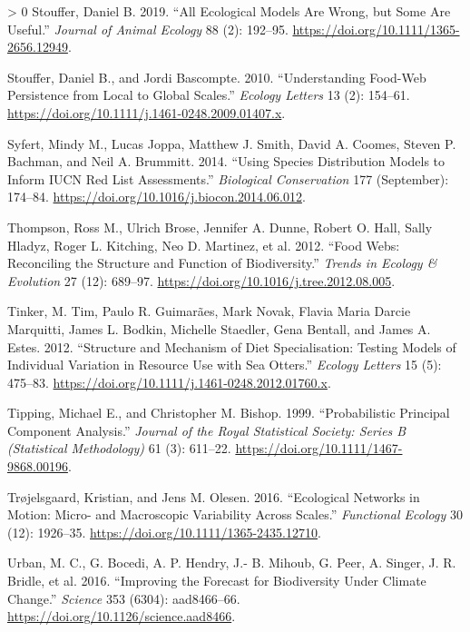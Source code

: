 \documentclass[11pt]{article}
\newlength{\cslhangindent}
\newenvironment{CSLReferences}[3] %
 {%
  \setlength{\parindent}{0pt}
  \ifodd #1 \everypar{\setlength{\hangindent}{\cslhangindent}}\ignorespaces\fi
  \ifnum #2 > 0
  \setlength{\parskip}{#2\baselineskip}
  \fi
 }%
 {}
\begin{document}
\begin{CSLReferences}{1}{0}
\leavevmode\hypertarget{ref-Stouffer2019AllEco}{}%
Stouffer, Daniel B. 2019. {``All Ecological Models Are Wrong, but Some
Are Useful.''} \emph{Journal of Animal Ecology} 88 (2): 192--95.
\url{https://doi.org/10.1111/1365-2656.12949}.

\leavevmode\hypertarget{ref-Stouffer2010UndFoo}{}%
Stouffer, Daniel B., and Jordi Bascompte. 2010. {``Understanding
Food-Web Persistence from Local to Global Scales.''} \emph{Ecology
Letters} 13 (2): 154--61.
\url{https://doi.org/10.1111/j.1461-0248.2009.01407.x}.

\leavevmode\hypertarget{ref-Syfert2014UsiSpe}{}%
Syfert, Mindy M., Lucas Joppa, Matthew J. Smith, David A. Coomes, Steven
P. Bachman, and Neil A. Brummitt. 2014. {``Using Species Distribution
Models to Inform IUCN Red List Assessments.''} \emph{Biological
Conservation} 177 (September): 174--84.
\url{https://doi.org/10.1016/j.biocon.2014.06.012}.

\leavevmode\hypertarget{ref-Thompson2012FooWeb}{}%
Thompson, Ross M., Ulrich Brose, Jennifer A. Dunne, Robert O. Hall,
Sally Hladyz, Roger L. Kitching, Neo D. Martinez, et al. 2012. {``Food
Webs: Reconciling the Structure and Function of Biodiversity.''}
\emph{Trends in Ecology \& Evolution} 27 (12): 689--97.
\url{https://doi.org/10.1016/j.tree.2012.08.005}.

\leavevmode\hypertarget{ref-Tinker2012StrMec}{}%
Tinker, M. Tim, Paulo R. Guimarães, Mark Novak, Flavia Maria Darcie
Marquitti, James L. Bodkin, Michelle Staedler, Gena Bentall, and James
A. Estes. 2012. {``Structure and Mechanism of Diet Specialisation:
Testing Models of Individual Variation in Resource Use with Sea
Otters.''} \emph{Ecology Letters} 15 (5): 475--83.
\url{https://doi.org/10.1111/j.1461-0248.2012.01760.x}.

\leavevmode\hypertarget{ref-Tipping1999ProPri}{}%
Tipping, Michael E., and Christopher M. Bishop. 1999. {``Probabilistic
Principal Component Analysis.''} \emph{Journal of the Royal Statistical
Society: Series B (Statistical Methodology)} 61 (3): 611--22.
\url{https://doi.org/10.1111/1467-9868.00196}.

\leavevmode\hypertarget{ref-Trojelsgaard2016EcoNet}{}%
Trøjelsgaard, Kristian, and Jens M. Olesen. 2016. {``Ecological Networks
in Motion: Micro- and Macroscopic Variability Across Scales.''}
\emph{Functional Ecology} 30 (12): 1926--35.
\url{https://doi.org/10.1111/1365-2435.12710}.

\leavevmode\hypertarget{ref-Urban2016ImpFor}{}%
Urban, M. C., G. Bocedi, A. P. Hendry, J.- B. Mihoub, G. Peer, A.
Singer, J. R. Bridle, et al. 2016. {``Improving the Forecast for
Biodiversity Under Climate Change.''} \emph{Science} 353 (6304):
aad8466--66. \url{https://doi.org/10.1126/science.aad8466}.


\end{CSLReferences}
\end{document}
